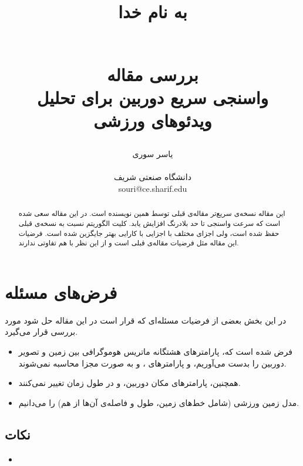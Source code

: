 \documentclass{report}
\title{
\begin{normalsize}
به نام خدا
\end{normalsize}
\\[2cm]
بررسی مقاله
\\[1cm]
واسنجی سریع دوربین برای تحلیل ویدئوهای ورزشی
}
\author{یاسر سوری
\\
\\ \small دانشگاه صنعتی شریف
\\ \small souri@ce.sharif.edu
}
\begin{document}
\maketitle

\begin{abstract}
این مقاله\cite{new_paper} نسخه‌ی سریع‌تر مقاله‌ی قبلی\cite{old_paper} توسط همین نویسنده است. در این مقاله سعی شده است که سرعت واسنجی تا حد بلادرنگ افزایش یابد. کلیت الگوریتم نسبت به نسخه‌ی قبلی حفظ شده است، ولی اجزای مختلف با اجزایی با کارایی بهتر جایگزین شده است. فرضیات این مقاله مثل فرضیات مقاله‌ی قبلی است و از این نظر با هم تفاوتی ندارند.

\end{abstract}

\section{فرض‌های مسئله}
در این بخش بعضی از فرضیات مسئله‌ای که قرار است در این مقاله حل شود مورد بررسی قرار می‌گیرد.
\begin{itemize}
\item
فرض شده است که، پارامتر‌های هشتگانه ماتریس هوموگرافی بین زمین و تصویر دوربین را بدست می‌آوریم، و پارامترهای ،  و  به صورت مجزا محاسبه نمی‌شوند.
\item
همچنین، پارامترهای مکان دوربین،  و  در طول زمان تغییر نمی‌کنند.
\item
مدل زمین ورزشی (شامل خط‌های زمین، طول و فاصله‌ی آن‌ها از هم) را می‌دانیم.
\end{itemize}
\subsection{نکات}
\begin{itemize}
\item

\end{itemize}
\end{document}
